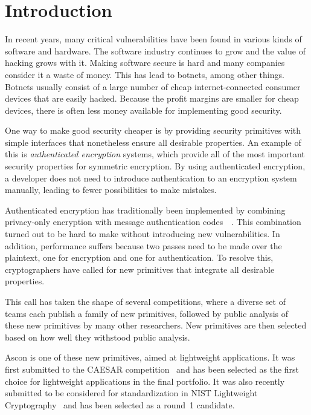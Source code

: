 \section{Introduction}

In recent years, many critical vulnerabilities have been found in various kinds
of software and hardware. The software industry continues to grow and the value
of hacking grows with it. Making software secure is hard and many companies
consider it a waste of money. This has lead to botnets, among other things.
Botnets usually consist of a large number of cheap internet-connected consumer
devices that are easily hacked. Because the profit margins are smaller for cheap
devices, there is often less money available for implementing good security.

One way to make good security cheaper is by providing security primitives with
simple interfaces that nonetheless ensure all desirable properties. An example
of this is \emph{authenticated encryption} systems, which provide all of the
most important security properties for symmetric encryption. By using
authenticated encryption, a developer does not need to introduce authentication
to an encryption system manually, leading to fewer possibilities to make
mistakes.

Authenticated encryption has traditionally been implemented by combining
privacy-only encryption with message authentication
codes~\cite{aeadorder}~\cite{classicaead}. This
combination turned out to be hard to make without introducing new
vulnerabilities. In addition, performance suffers because two passes need to be
made over the plaintext, one for encryption and one for authentication. To
resolve this, cryptographers have called for new primitives that integrate all
desirable properties.

This call has taken the shape of several competitions, where a diverse set of
teams each publish a family of new primitives, followed by public analysis of
these new primitives by many other researchers. New primitives are then selected
based on how well they withstood public analysis.

Ascon is one of these new primitives, aimed at lightweight applications. It was
first submitted to the CAESAR competition~\cite{caesar} and has been selected as
the first choice for lightweight applications in the final portfolio. It was
also recently submitted to be considered for standardization in NIST Lightweight
Cryptography~\cite{nistlc} and has been selected as a round~1 candidate.

